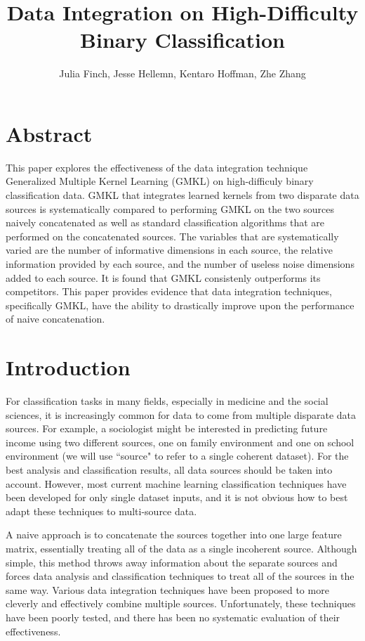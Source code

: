 \documentclass{article}
\begin{document}
\title{Data Integration on High-Difficulty Binary Classification}
\author{Julia Finch, Jesse Hellemn, Kentaro Hoffman, Zhe Zhang}
\maketitle


\section*{Abstract}

This paper explores the effectiveness of the data integration technique Generalized Multiple Kernel Learning (GMKL) on high-difficuly binary classification data. GMKL that integrates learned kernels from two disparate data sources is systematically compared to performing GMKL on the two sources naively concatenated as well as standard classification algorithms that are performed on the concatenated sources. The variables that are systematically varied are the number of informative dimensions in each source, the relative information provided by each source, and the number of useless noise dimensions added to each source. It is found that GMKL consistenly outperforms its competitors. This paper provides evidence that data integration techniques, specifically GMKL, have the ability to drastically improve upon the performance of naive concatenation.

\section*{Introduction}
For classification tasks in many fields, especially in medicine and the social
sciences, it is increasingly common for data to come from multiple disparate
data sources. For example, a sociologist might be interested in predicting
future income using two different sources, one on family environment and one on
school environment (we will use ``source" to refer to a single coherent
dataset). For the best analysis and classification results, all data sources
should be taken into account. However, most current machine learning
classification techniques have been developed for only single dataset inputs,
and it is not obvious how to best adapt these techniques to multi-source data.

A naive approach is to concatenate the sources together into one large feature
matrix, essentially treating all of the data as a single incoherent source.
Although simple, this method throws away
information about the separate sources and forces data analysis and
classification techniques to treat all of the sources in the same way. Various
data integration techniques have been proposed to more cleverly and effectively
combine multiple sources. Unfortunately, these techniques have been poorly
tested, and there has been no systematic evaluation of their effectiveness.
\end{document}
